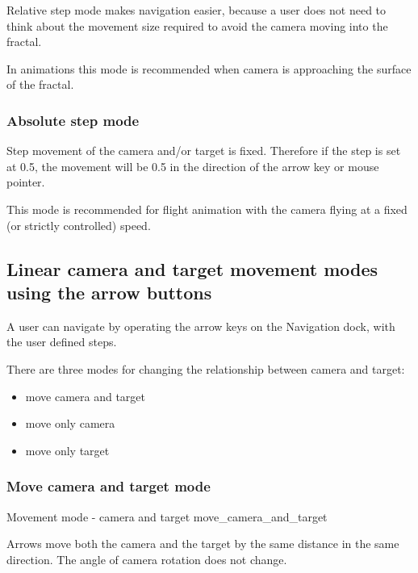 Relative step mode makes navigation easier, because a user does not need to think about the movement size required to avoid
the camera moving into the fractal.

In animations this mode is recommended when camera is approaching the surface of
the fractal.

\subsubsection{Absolute step mode}\label{absolute-step-mode}

Step movement of the camera and/or target is fixed. Therefore if the step is set
at 0.5, the movement will be 0.5 in the direction of the arrow key or mouse
pointer.

This mode is recommended for flight animation with the camera flying at a fixed (or strictly
controlled) speed.

\subsection{Linear camera and target movement modes using the arrow
	buttons}\label{linear-camera-and-target-movement-modes-using-the-arrow-buttons}

A user can navigate by operating the arrow keys on the Navigation dock, with the
user defined steps.

There are three modes for changing the relationship between camera and target:

\begin{multicols}{3}
\begin{itemize}
	\item move camera and target
	\item move only camera
	\item move only target
\end{itemize}
\end{multicols}

\subsubsection{Move camera and target mode}\label{move-camera-and-target-mode}

{Movement mode - camera and target}
{move_camera_and_target}

Arrows move both the camera and the target by the same distance in the same
direction. The angle of camera rotation does not change.


